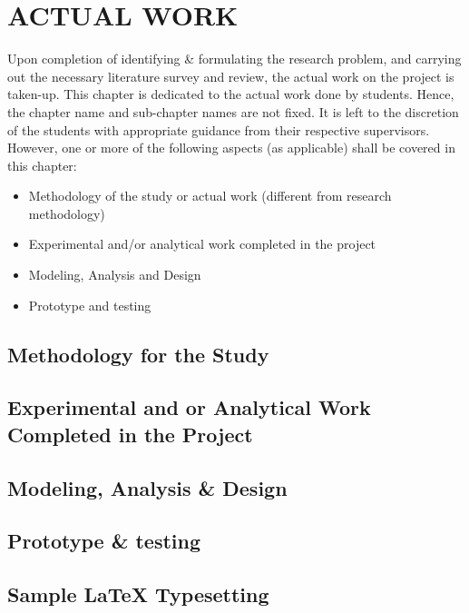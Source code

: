 \chapter{ACTUAL WORK} %
\label{ChapterActualWork} %


Upon completion of identifying \& formulating the research problem, and carrying out the necessary literature survey and review, the actual work on the project is taken-up. This chapter is dedicated to the actual work done by students. Hence, the chapter name and sub-chapter names are not fixed. It is left to the discretion of the students with appropriate guidance from their respective supervisors. However, one or more of the following aspects (as applicable) shall be covered in this chapter:
\begin{itemize}
	\item Methodology of the study or actual work (different from research methodology)
	\item Experimental and/or analytical work completed in the project
	\item Modeling, Analysis and Design
	\item Prototype and testing
\end{itemize}



\section{Methodology for the Study}

\section{Experimental and or Analytical Work Completed in the Project}

\section{Modeling, Analysis \& Design}

\section{Prototype \& testing}

\section*{Sample LaTeX Typesetting}


